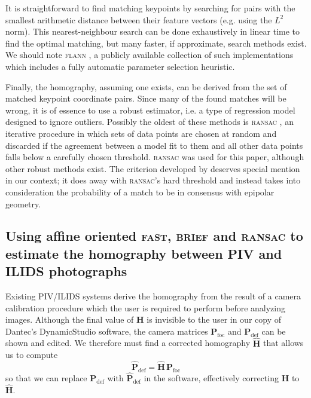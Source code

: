 \documentclass[11.5pt,oneside]{book}
\begin{document}
It is straightforward to find matching keypoints by searching for pairs
with the smallest arithmetic distance between their feature vectors (e.g. using the $L^2$ norm). This nearest-neighbour search
can be done exhaustively in linear time to find the optimal matching, but many
faster, if approximate, search methods exist. We should note \textsc{flann} \cite{Muja09},
a publicly available collection of such implementations which includes a fully
automatic parameter selection heuristic.

Finally, the homography, assuming one exists, can be derived from the set of
matched keypoint coordinate pairs. Since many of the found matches will be
wrong, it is of essence to use a robust estimator, i.e. a type of regression
model designed to ignore outliers. Possibly the oldest of these methods is
\textsc{ransac} \cite{Fischler81}, an iterative procedure in which sets of data points are
chosen at random and discarded if the agreement between a model fit to them and
all other data points falls below a carefully chosen threshold. \textsc{ransac} was used
for this paper, although other robust methods exist. The criterion developed by
\citet{Moisan04} deserves special mention in our context; it does away with
\textsc{ransac}'s hard threshold and instead takes into consideration the probability of
a match to be in consensus with epipolar geometry.

\subsection{Using affine oriented \textsc{fast}, \textsc{brief} and \textsc{ransac} to estimate the homography
between PIV and ILIDS photographs \label{sec:results}}

Existing PIV/ILIDS systems derive the homography from the result of a camera
calibration procedure which the user is required to perform before analyzing
images.
Although the final value of $\mathbf{H}$ is invisible to the user in our copy of
Dantec's DynamicStudio software, the camera matrices $\mathbf{P}_\text{foc}$ and
$\mathbf{P}_\text{def}$ can be shown and edited. We therefore must find a
corrected homography $\mathbf{\hat{H}}$ that allows us to compute
\begin{equation}
    \mathbf{\hat{P}}_\text{def} = \mathbf{\hat{H}} \, \mathbf{P}_\text{foc}
    \label{corrected-homography-use}
\end{equation}
so that we can replace $\mathbf{P}_\text{def}$ with $\mathbf{\hat{P}}_\text{def}$ in
the software, effectively correcting $\mathbf{H}$ to $\mathbf{\hat{H}}$.
\end{document}
